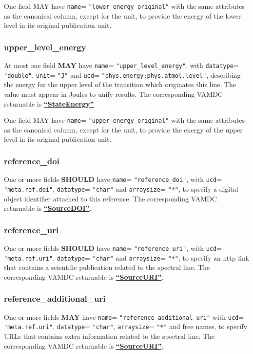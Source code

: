 \documentclass[11pt,a4paper]{ivoa}
\def\attrval#1#2{\texttt{#1}\discretionary{}{}{}=\discretionary{}{}{}%
  \texttt{"#2"}}
\def\vamdcret#1{\href{https://dictionary.vamdc.eu/returnables/\##1}{\textbf{``\color{vamdccolor}#1''}}}
\begin{document}
One field MAY have \attrval{name}{lower\_energy\_original} with the same attributes
as the canonical column, except for the unit, to provide the energy of the lower level
in its original publication unit.

\subsubsection{upper\_level\_energy}

At most one field \textbf{MAY} have \attrval{name}{upper\_level\_energy}, with
\attrval{datatype}{double}, \attrval{unit}{J} and
\attrval{ucd}{phys.energy;phys.atmol.level},
describing the energy for the upper level of the transition which originates this line.
The value must appear in Joules to unify results. The corresponding VAMDC returnable is \vamdcret{StateEnergy}

One field MAY have \attrval{name}{upper\_energy\_original} with the same attributes
as the canonical column, except for the unit, to provide the energy of the upper level
in its original publication unit.

\subsubsection{reference\_doi}

One or more fields \textbf{SHOULD} have \attrval{name}{reference\_doi}, with \attrval{ucd}{meta.ref.doi}, \attrval{datatype}{char} and
\attrval{arraysize}{*}, to specify a digital object identifier
attached to this reference. The corresponding VAMDC returnable is \vamdcret{SourceDOI}.

\subsubsection{reference\_uri}

One or more fields \textbf{SHOULD} have \attrval{name}{reference\_uri},
with \attrval{ucd}{meta.ref.uri}, \attrval{datatype}{char} and
\attrval{arraysize}{*}, to specify an http link that contains a scientific publication related to the spectral line.
The corresponding VAMDC returnable is \vamdcret{SourceURI}.


\subsubsection{reference\_additional\_uri}

One or more fields \textbf{MAY} have \attrval{name}{reference\_additional\_uri} with
\attrval{ucd}{meta.ref.uri}, \attrval{datatype}{char}, \attrval{arraysize}{*} and free names,
to specify URLs that contains extra information related to the spectral line.
The corresponding VAMDC returnable is \vamdcret{SourceURI}.
\end{document}
